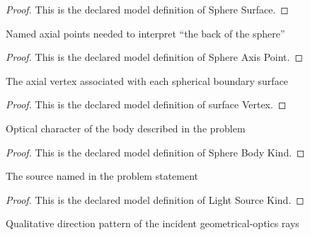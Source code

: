 \begin{proof}
  This is the declared model definition of Sphere Surface.
\end{proof}
\begin{definition}
  \label{def:physics:phyx-mini-0477:phyxminiproblems-problemphyxmini0477-sphereaxispoint}
  Named axial points needed to interpret “the back of the sphere”
\end{definition}
\begin{proof}
  This is the declared model definition of Sphere Axis Point.
\end{proof}
\begin{definition}
  \label{def:physics:phyx-mini-0477:phyxminiproblems-problemphyxmini0477-surfacevertex}
  The axial vertex associated with each spherical boundary surface
\end{definition}
\begin{proof}
  This is the declared model definition of surface Vertex.
\end{proof}
\begin{definition}
  \label{def:physics:phyx-mini-0477:phyxminiproblems-problemphyxmini0477-spherebodykind}
  Optical character of the body described in the problem
\end{definition}
\begin{proof}
  This is the declared model definition of Sphere Body Kind.
\end{proof}
\begin{definition}
  \label{def:physics:phyx-mini-0477:phyxminiproblems-problemphyxmini0477-lightsourcekind}
  The source named in the problem statement
\end{definition}
\begin{proof}
  This is the declared model definition of Light Source Kind.
\end{proof}
\begin{definition}
  \label{def:physics:phyx-mini-0477:phyxminiproblems-problemphyxmini0477-incidentraypattern}
  Qualitative direction pattern of the incident geometrical-optics rays
\end{definition}
